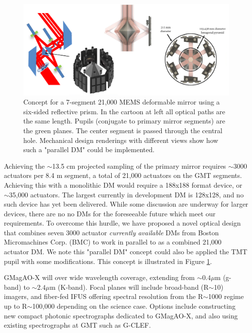 \documentclass[12pt,preprint]{aastex}
\begin{document}
\begin{figure} [h!]
\centering
\includegraphics[width=5in]{figures/pardm.png}
\vspace{-0.1in}
\caption{ Concept for a 7-segment 21,000 MEMS deformable mirror using a six-sided reflective prism.  In the cartoon at left all optical paths are the same length.  Pupils (conjugate to primary mirror segments) are the green planes. The center segment is passed through the central hole. Mechanical design renderings with different views show how such a "parallel DM" could be implemented.  \label{fig:pardm}}
\vspace{-0.1in}
\end{figure}

Achieving the $\sim$13.5 cm projected sampling of the primary mirror requires $\sim$3000 actuators per 8.4 m segment, a total of 21,000 actuators on the GMT segments.   Achieving this with a monolithic DM would require a 188x188 format device, or $\sim$35,000 actuators. The largest currently in development DM is 128x128, and no such device has yet been delivered.  While some discussion are underway for larger devices, there are no no DMs for the foreseeable future which meet our requirements. To overcome this hurdle, we have proposed a novel optical design that combines seven 3000 actuator \textit{currently available} DMs from Boston Micromachines Corp. (BMC) to work in parallel to as a combined 21,000 actuator DM. We note this "parallel DM" concept could also be applied the TMT pupil with some modifications.  This concept is illustrated in Figure \ref{fig:pardm}.

GMagAO-X will over wide wavelength coverage, extending from $\sim 0.4 \mu$m (g-band) to $\sim 2.4 \mu$m (K-band).  Focal planes will include broad-band (R$\sim$10) imagers, and fiber-fed IFUS offering spectral resolution from the R$\sim$1000 regime up to R$\sim$100,000 depending on the science case. Options include constructing new compact photonic spectrographs dedicated to GMagAO-X, and also using existing spectrographs at GMT such as G-CLEF.
\end{document}

